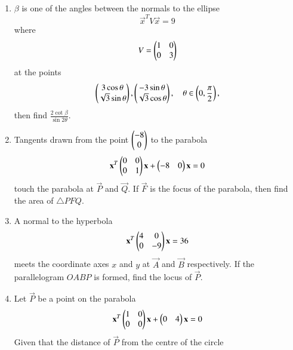 \documentclass[journal,12pt,twocolumn]{IEEEtran}
\begin{document}
\begin{enumerate}[label=\arabic*.]
%
\item $\beta$ is one of the angles between the normals to the ellipse
\begin{equation}
\vec{x}^TV\vec{x} =9
\end{equation}
%
where
\begin{equation}
V = \begin{pmatrix}1 & 0 \\ 0 & 3\end{pmatrix}
\end{equation}
%
at the points
\begin{equation}
\begin{pmatrix}3\cos\theta\\ \sqrt{3}\sin \theta\end{pmatrix},
\begin{pmatrix}-3\sin\theta\\ \sqrt{3}\cos \theta\end{pmatrix}, \quad \theta \in \left(0,\frac{\pi}{2}\right),
\end{equation}
then find $\frac{2\cot \beta}{\sin 2\theta}$.
\item Tangents drawn from the point $\begin{pmatrix}-8\\0\end{pmatrix}$ to the parabola
\begin{equation}
\mathbf{x}^T\begin{pmatrix}0 & 0 \\ 0 & 1\end{pmatrix}\mathbf{x} + \begin{pmatrix}-8 & 0\end{pmatrix}\mathbf{x} 
 = 0
\end{equation}
%
touch the parabola at $\vec{P}$ and  $\vec{Q}$. If $\vec{F}$ is the focus of the parabola, then find the area 
of $\triangle PFQ$.
\item A normal to the hyperbola 
\begin{equation}
\mathbf{x}^T\begin{pmatrix}4 & 0 \\ 0 & -9\end{pmatrix}\mathbf{x} 
 = 36
\end{equation}
%
meets the coordinate axes $x$ and $y$ at $\vec{A}$ and $\vec{B}$ respectively.  If the parallelogram $OABP$ is 
formed, find the locus of $\vec{P}$.
\item Let $\vec{P}$ 
be a point on the parabola
\begin{equation}
\mathbf{x}^T\begin{pmatrix}1 & 0 \\ 0 & 0\end{pmatrix}\mathbf{x} +\begin{pmatrix}0 & 4 \end{pmatrix}\mathbf{x} 
 = 0
\end{equation}
Given that the distance of $\vec{P}$ from the centre of the circle

\end{enumerate}
\end{document}
